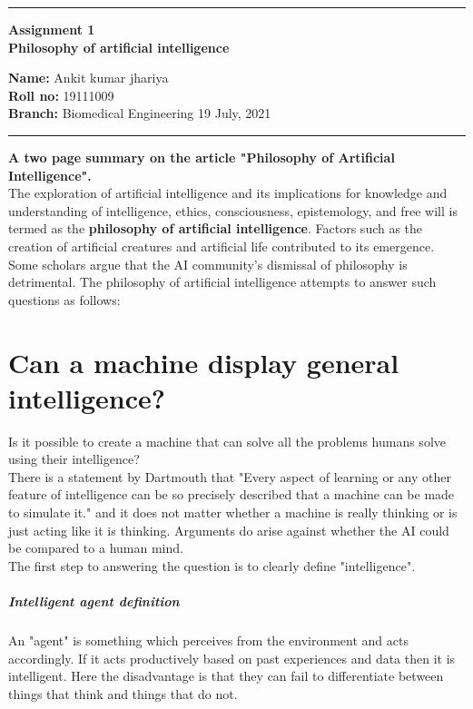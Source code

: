 \documentclass[10pt,a4paper,twoside]{article}
\begin{document}
\begin{center}
\hrule

\vspace{.3cm}
{\bf {\Large Assignment 1 }}\\
{\bf {\huge Philosophy of artificial intelligence}}
\vspace{.2cm}
\end{center}
{\bf Name:}  Ankit kumar jhariya\\
{\bf Roll no:}  19111009\\
{\bf Branch: }  Biomedical Engineering \hspace{\fill}  19 July, 2021 \\
\hrule

\vspace{.4cm}
{\textbf{\large A two page summary on the article "Philosophy of Artificial Intelligence".}} \\

The exploration of artificial intelligence and its implications for knowledge and understanding of intelligence, ethics, consciousness, epistemology, and free will is termed as the \textbf{\large{philosophy of artificial intelligence}}. Factors such as the creation of artificial creatures and artificial life contributed to its emergence.
Some scholars argue that the AI community's dismissal of philosophy is detrimental.
The philosophy of artificial intelligence attempts to answer such questions as follows:

\section{Can a machine display general intelligence?}
Is it possible to create a machine that can solve all the problems humans solve using their intelligence?\\
There is a statement by Dartmouth that "Every aspect of learning or any other feature of intelligence can be so precisely described that a machine can be made to simulate it." and it does not matter whether a machine is really thinking or is just acting like it is thinking. Arguments do arise against whether the AI could be compared to a human mind.\\
The first step to answering the question is to clearly define "intelligence".

\subparagraph{Intelligent agent definition}
An "agent" is something which perceives from the environment and acts accordingly. If it acts productively based on past experiences and data then it is intelligent. Here the disadvantage is that they can fail to differentiate between things that think and things that do not.
\end{document}
